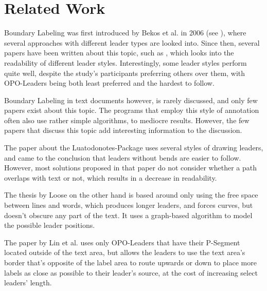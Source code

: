 \documentclass[11pt,a4paper]{vutinfth}
\begin{document}

\section{Related Work}

Boundary Labeling was first introduced by Bekos et al. in 2006 (see \cite{Bekos2007}), where several approaches with different leader types are looked into. Since then, several papers have been written about this topic, such as \cite{Barth2015}, which looks into the readability of different leader styles. Interestingly, some leader styles perform quite well, despite the study's participants preferring others over them, with OPO-Leaders being both least preferred and the hardest to follow.

Boundary Labeling in text documents however, is rarely discussed, and only few papers exist about this topic. The programs that employ this style of annotation often also use rather simple algorithms, to mediocre results. However, the few papers that discuss this topic add interesting information to the discussion. %

The paper about the Luatodonotes-Package\cite{Kindermann2014} uses several styles of drawing leaders, and came to the conclusion that leaders without bends are easier to follow. %
However, most solutions proposed in that paper do not consider whether a path overlaps with text or not, which results in a decrease in readability.

The thesis by Loose\cite{Loose2015} on the other hand is based around only using the free space between lines and words, which produces longer leaders, and forces curves, but doesn't obscure any part of the text. It uses a graph-based algorithm to model the possible leader positions.

The paper by Lin et al.\cite{Lin2009} uses only OPO-Leaders that have their P-Segment located outside of the text area, but allows the leaders to use the text area's border that's opposite of the label area to route upwards or down to place more labels as close as possible to their leader's source, at the cost of increasing select leaders' length.
\end{document}

